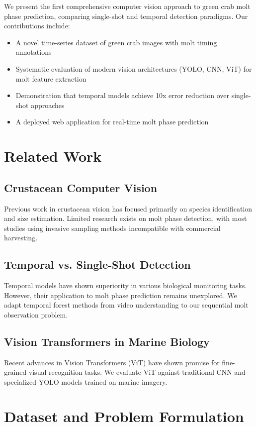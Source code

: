 \documentclass[10pt,twocolumn,letterpaper]{article}
\begin{document}
We present the first comprehensive computer vision approach to green crab molt phase prediction, comparing single-shot and temporal detection paradigms. Our contributions include:

\begin{itemize}
\item A novel time-series dataset of green crab images with molt timing annotations
\item Systematic evaluation of modern vision architectures (YOLO, CNN, ViT) for molt feature extraction
\item Demonstration that temporal models achieve 10x error reduction over single-shot approaches
\item A deployed web application for real-time molt phase prediction
\end{itemize}

\section{Related Work}

\subsection{Crustacean Computer Vision}
Previous work in crustacean vision has focused primarily on species identification and size estimation. Limited research exists on molt phase detection, with most studies using invasive sampling methods incompatible with commercial harvesting.

\subsection{Temporal vs. Single-Shot Detection}
Temporal models have shown superiority in various biological monitoring tasks. However, their application to molt phase prediction remains unexplored. We adapt temporal forest methods from video understanding to our sequential molt observation problem.

\subsection{Vision Transformers in Marine Biology}
Recent advances in Vision Transformers (ViT) have shown promise for fine-grained visual recognition tasks. We evaluate ViT against traditional CNN and specialized YOLO models trained on marine imagery.

\section{Dataset and Problem Formulation}
\end{document}
